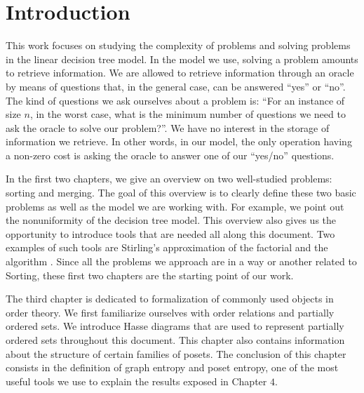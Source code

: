 \chapter*{Introduction}

This work focuses on studying the complexity of problems and solving problems
in the linear decision tree model. In the model we use, solving a problem
amounts to retrieve information. We are allowed to retrieve information
through an oracle by means of questions that, in the general case,
can be answered ``yes'' or ``no''. The kind of questions we ask ourselves
about a problem is: ``For an instance of size \(n\), in the worst case, what is
the minimum number of questions we need to ask the oracle to solve our
problem?''. We have no interest in the storage of information we retrieve.
In other words, in our model, the only operation having a non-zero cost is
asking the oracle to answer one of our ``yes/no'' questions.

In the first two chapters, we give an overview on two well-studied problems:
sorting and merging. The goal of this overview is to clearly define these two
basic problems as well as the model we are working with. For example, we point
out the nonuniformity of the decision tree model. This overview also gives us
the opportunity to introduce tools that are needed all along this document. Two
examples of such tools are Stirling's approximation of the factorial
\cite{feller1967direct} and the \mergesort algorithm
\cite{goldstine:1948,leiserson:2001}. Since all the problems we approach are in
a way or another related to Sorting, these first two chapters are the starting
point of our work.

The third chapter is dedicated to formalization of commonly used objects
in order theory. We first familiarize ourselves with order
relations and partially ordered sets. We introduce Hasse diagrams that
are used to represent partially ordered sets throughout this document.
This chapter also contains information about the structure of
certain families of posets. The conclusion of this
chapter consists in the definition of graph entropy \cite{korner1973coding}
and poset entropy, one of the most useful tools we use to explain the
results exposed in Chapter \(4\).

